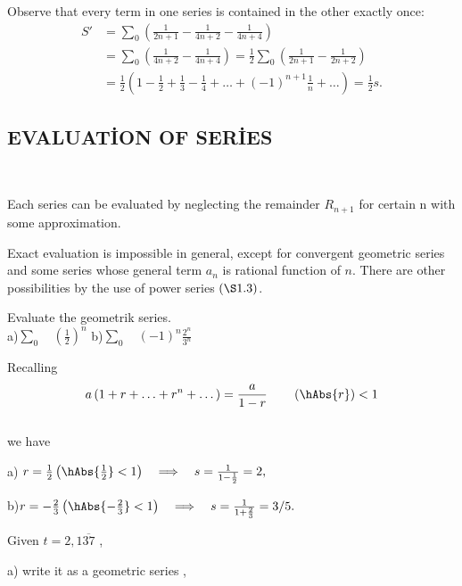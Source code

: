 \documentclass[11pt]{amsbook}
\begin{document}
Observe that every term in one series is contained in the other exactly once: 
\begin{align*}
    S' &= \sum\limits_{0} \left( \frac{1}{2n+1}-\frac{1}{4n+2}-\frac{1}{4n+4}\right) 
    \\ &= \sum\limits_{0}\left(\frac{1}{4n+2}-\frac{1}{4n+4}\right)=\frac{1}{2}\sum\limits_{0} \left( \frac{1}{2n+1}-\frac{1}{2n+2}\right)
    \\ &= \frac{1}{2}\left(1-\frac{1}{2}+\frac{1}{3}-\frac{1}{4}+\dotsc+\left( -1 \right)^{n+1} \frac{1}{n}+\dotsc \right)=\frac{1}{2} s.
\end{align*}
\subsection{EVALUATİON OF SERİES} \ 

Each series can be evaluated by neglecting the remainder $R_{n+1}$ for certain n with some approximation.

Exact evaluation is impossible in general, except for convergent geometric series and some series whose general term $a_n$ is rational function of $n$. There are other possibilities by the use of power series $\left( \S 1.3 \right)$.
\begin{exmp}
Evaluate the geometrik series.\\
a)$\sum\limits_{0}\quad \left( \frac{1}{2}\right)^n $ \qquad \qquad \qquad \qquad
b)$\sum\limits_{0}\quad \left(-1\right)^n \frac{2^n}{3^n}$
\end{exmp}

\begin{hSolution} Recalling
$$a \left(1+r+\dotsc+r^n+\dotsc \right) =\frac{a}{1-r} \qquad \left( \hAbs{r} \right) < 1 $$ \\
we have

a) $ r= \frac{1}{2} \left ( \hAbs{\frac{1}{2}} < 1 \right )\quad \Longrightarrow \quad  s= \frac{1}{1-\frac{1}{2}} = 2 , $	

b)$ r= - \frac{2}{3} \left ( \hAbs{-\frac{2}{3}} < 1 \right )\quad \Longrightarrow \quad  s= \frac{1}{1+\frac{2}{3}} = 3/5 . $
\end{hSolution}
\begin{exmp}
Given $ t = 2,1\overline{37}  $ ,

a) write it as a geometric series ,
 \end{exmp}
\end{document}
